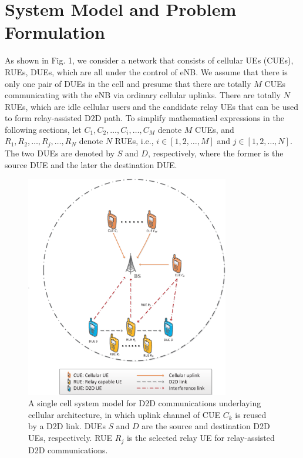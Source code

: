 \documentclass[conference]{IEEEtran}
\begin{document}
\section{System Model and Problem Formulation}
As shown in Fig. 1, we consider a network that consists of cellular UEs (CUEs), RUEs, DUEs, which are all under the control of eNB. We assume that there is only one pair of DUEs in the cell and presume that there are totally $M$ CUEs communicating with the eNB via ordinary cellular uplinks. There are totally $N$ RUEs, which are idle cellular users and the candidate relay UEs that can be used to form relay-assisted D2D path. To simplify mathematical expressions in the following sections, let $C_{1},C_{2},\ldots,C_{i},\ldots,C_{M}$ denote $M$ CUEs, and $R_{1},R_{2},\ldots,R_{j},\ldots,R_{N}$ denote $N$ RUEs, i.e., $i\in\left[1,2,\ldots,M\right]$ and $j\in\left[1,2,\ldots,N\right]$. The two DUEs are denoted by $S$ and $D$, respectively, where the former is the source DUE and the later the destination DUE.
\begin{figure}[!t]
\center
\includegraphics[width=3.5in]{fig1}
\caption{A single cell system model for D2D communications underlaying cellular architecture, in which uplink channel of CUE $C_k$ is reused by a D2D link. DUEs $S$ and $D$ are the source and destination D2D UEs, respectively. RUE $R_j$ is the selected relay UE for relay-assisted D2D communications.}
\label{fig_success}
\end{figure}
\end{document}
